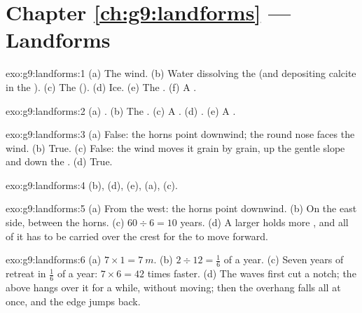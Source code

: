 \section*{Chapter \ref{ch:g9:landforms} --- Landforms}

\begin{solution}{exo:g9:landforms:1}
(a) The wind. (b) Water dissolving the  (and depositing calcite in the
). (c) The  (). (d) Ice. (e) The . (f) A .
\end{solution}

\begin{solution}{exo:g9:landforms:2}
(a) . (b) The . (c) A . (d) .
(e) A .
\end{solution}

\begin{solution}{exo:g9:landforms:3}
(a) False: the horns point downwind; the round nose faces the wind.
(b) True. (c) False: the wind moves it grain by grain, up the gentle slope
and down the . (d) True.
\end{solution}

\begin{solution}{exo:g9:landforms:4}
(b), (d), (e), (a), (c).
\end{solution}

\begin{solution}{exo:g9:landforms:5}
(a) From the west: the horns point downwind. (b) On the east side, between
the horns. (c) $60 \div 6 = 10$ years. (d) A larger  holds more ,
and all of it has to be carried over the crest for the  to move
forward.
\end{solution}

\begin{solution}{exo:g9:landforms:6}
(a) $7 \times 1 = \qty{7}{m}$. (b) $2 \div 12 = \frac{1}{6}$ of a year.
(c) Seven years of retreat in $\frac{1}{6}$ of a year: $7 \times 6 = 42$
times faster. (d) The waves first cut a notch; the  above hangs over it
for a while, without moving; then the overhang falls all at once, and the
edge jumps back.
\end{solution}


